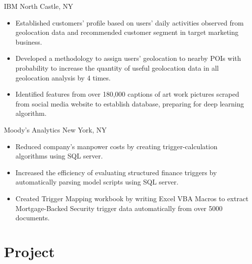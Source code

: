 \documentclass[11pt,a4paper,roman]{moderncv} %
\begin{document}
{IBM}
{North Castle, NY}{}
{\begin{itemize}  %
	\item Established customers' profile based on users' daily activities observed from geolocation data and recommended customer segment in target marketing business.
	\item Developed a methodology to assign users' geolocation to nearby POIs with probability to increase the quantity of useful geolocation data in all geolocation analysis by 4 times.
	\item Identified features from over 180,000 captions of art work pictures scraped from social media website to establish database, preparing for deep learning algorithm.
\end{itemize}}

{Moody's Analytics}
{New York, NY}{}
{\begin{itemize}  %
	\item Reduced company's manpower costs by creating trigger-calculation algorithms using SQL server. %
	\item Increased the efficiency of evaluating structured finance triggers by automatically parsing model scripts using SQL server. %
	\item Created Trigger Mapping workbook by writing Excel VBA Macros to extract Mortgage-Backed Security trigger data automatically from over 5000 documents. %
\end{itemize}}



\section{Project}
\end{document}
